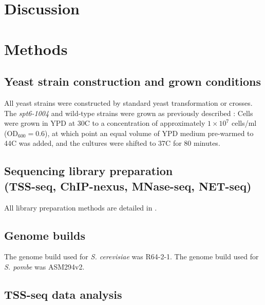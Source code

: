 \section{Discussion}

\clearpage
\section{Methods}

\subsection{Yeast strain construction and grown conditions}

All yeast strains were constructed by standard yeast transformation or crosses.
The \textit{spt6-1004} and wild-type strains were grown as previously described \citep{cheung2008}: Cells were grown in YPD at 30\textdegree C to a concentration of approximately $1 \times 10^7$ cells/ml (OD$_{600} = 0.6$), at which point an equal volume of YPD medium pre-warmed to 44\textdegree C was added, and the cultures were shifted to 37\textdegree C for 80 minutes.

\subsection{Sequencing library preparation\\(TSS-seq, ChIP-nexus, MNase-seq, NET-seq)}

All library preparation methods are detailed in \citet{doris2018}.

\subsection{Genome builds}

The genome build used for \textit{S. cerevisiae} was R64-2-1.
The genome build used for \textit{S. pombe} was ASM294v2.

\subsection{TSS-seq data analysis}

